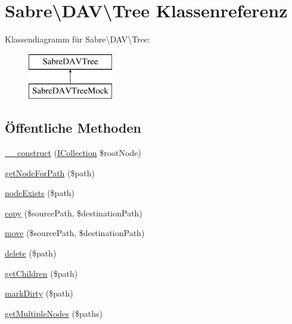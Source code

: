 \hypertarget{class_sabre_1_1_d_a_v_1_1_tree}{}\section{Sabre\textbackslash{}D\+AV\textbackslash{}Tree Klassenreferenz}
\label{class_sabre_1_1_d_a_v_1_1_tree}
Klassendiagramm für Sabre\textbackslash{}D\+AV\textbackslash{}Tree\+:\begin{figure}[H]
\begin{center}
\leavevmode
\includegraphics[height=2.000000cm]{class_sabre_1_1_d_a_v_1_1_tree}
\end{center}
\end{figure}
\subsection*{Öffentliche Methoden}
\begin{DoxyCompactItemize}
\item 
\mbox{\hyperlink{class_sabre_1_1_d_a_v_1_1_tree_a27f9fc4daf3fe3dcdd53d11f5e00bb9e}{\+\_\+\+\_\+construct}} (\mbox{\hyperlink{interface_sabre_1_1_d_a_v_1_1_i_collection}{I\+Collection}} \$root\+Node)
\item 
\mbox{\hyperlink{class_sabre_1_1_d_a_v_1_1_tree_a55b3f7a65673158036984f3f110c532f}{get\+Node\+For\+Path}} (\$path)
\item 
\mbox{\hyperlink{class_sabre_1_1_d_a_v_1_1_tree_a928c5acce9bbbf4006eba04266bc819f}{node\+Exists}} (\$path)
\item 
\mbox{\hyperlink{class_sabre_1_1_d_a_v_1_1_tree_a18da66484addb3d663cfb4b96fd558ad}{copy}} (\$source\+Path, \$destination\+Path)
\item 
\mbox{\hyperlink{class_sabre_1_1_d_a_v_1_1_tree_ac7fec7c688ada5aa76c785400669ef19}{move}} (\$source\+Path, \$destination\+Path)
\item 
\mbox{\hyperlink{class_sabre_1_1_d_a_v_1_1_tree_abc6ad730a8061ab1fdcdc7a48a53f2ae}{delete}} (\$path)
\item 
\mbox{\hyperlink{class_sabre_1_1_d_a_v_1_1_tree_a17a656c73d34b615ee94dda561906cdd}{get\+Children}} (\$path)
\item 
\mbox{\hyperlink{class_sabre_1_1_d_a_v_1_1_tree_a6620dc04c009acd09de1a0f66a43dc47}{mark\+Dirty}} (\$path)
\item 
\mbox{\hyperlink{class_sabre_1_1_d_a_v_1_1_tree_a416b65f3262503d1f3ac549331719d0c}{get\+Multiple\+Nodes}} (\$paths)
\end{DoxyCompactItemize}
